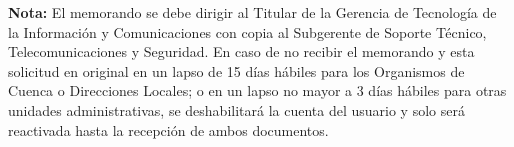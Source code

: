 \documentclass[letterpaper,11pt]{article}
\begin{document}
{\tiny {\textbf{ Nota:}} El memorando se debe dirigir al Titular de la Gerencia de Tecnología de la Información y Comunicaciones con copia al Subgerente de Soporte Técnico, Telecomunicaciones y Seguridad. En caso de no recibir el memorando y esta solicitud en original en un lapso de 15 días hábiles para los Organismos de Cuenca o Direcciones Locales; o en un lapso no mayor a 3 días hábiles para otras unidades administrativas, se deshabilitará la cuenta del usuario y solo será reactivada hasta la recepción de ambos documentos.}
\end{document}

